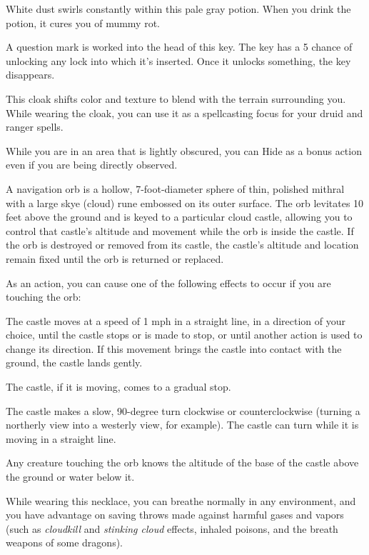 \documentclass[10pt,a4paper,twoside,bg=print,twocolumn,openany,nodeprecatedcode]{dndbook}
\begin{document}
White dust swirls constantly within this pale gray potion. When you drink the potion, it cures you of mummy rot.

A question mark is worked into the head of this key. The key has a 5 chance of unlocking any lock into which it's inserted. Once it unlocks something, the key disappears.

This cloak shifts color and texture to blend with the terrain surrounding you. While wearing the cloak, you can use it as a spellcasting focus for your druid and ranger spells.

While you are in an area that is lightly obscured, you can Hide as a bonus action even if you are being directly observed.

A navigation orb is a hollow, 7-foot-diameter sphere of thin, polished mithral with a large skye (cloud) rune embossed on its outer surface. The orb levitates 10 feet above the ground and is keyed to a particular cloud castle, allowing you to control that castle's altitude and movement while the orb is inside the castle. If the orb is destroyed or removed from its castle, the castle's altitude and location remain fixed until the orb is returned or replaced.

As an action, you can cause one of the following effects to occur if you are touching the orb:

The castle moves at a speed of 1 mph in a straight line, in a direction of your choice, until the castle stops or is made to stop, or until another action is used to change its direction. If this movement brings the castle into contact with the ground, the castle lands gently.

The castle, if it is moving, comes to a gradual stop.

The castle makes a slow, 90-degree turn clockwise or counterclockwise (turning a northerly view into a westerly view, for example). The castle can turn while it is moving in a straight line.

Any creature touching the orb knows the altitude of the base of the castle above the ground or water below it.

While wearing this necklace, you can breathe normally in any environment, and you have advantage on saving throws made against harmful gases and vapors (such as \textit{cloudkill} and \textit{stinking cloud} effects, inhaled poisons, and the breath weapons of some dragons).
\end{document}

